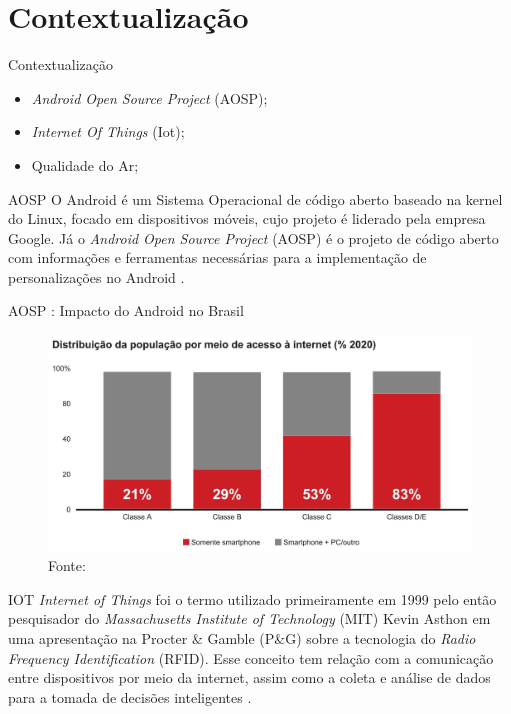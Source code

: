 \documentclass[12pt]{beamer}
\begin{document}
    \section{Contextualização}

    \begin{frame}{Contextualização}
        \begin{itemize}
            \item \textit{Android Open Source Project} (AOSP);
            \item \textit{Internet Of Things} (Iot);
            \item Qualidade do Ar;
        \end{itemize}
    \end{frame}

    \begin{frame}{AOSP}
        O Android é um Sistema Operacional de código aberto baseado na kernel do Linux, focado em dispositivos móveis, cujo projeto é liderado pela empresa Google. Já o \textit{Android Open Source Project} (AOSP) é o projeto  de código aberto com informações e ferramentas necessárias para a implementação de personalizações no Android \cite{aosp-documentation}. 
    \end{frame}

    \begin{frame}{AOSP : Impacto do Android no Brasil}
        \begin{figure}
            \centering
            \includegraphics[width=0.92\linewidth]{android-2.png}
            \caption{Fonte: \cite{impactoAndroidBrazil}}
            \label{fig:fig4}
        \end{figure}
    \end{frame}

    \begin{frame}{IOT}
        \textit{Internet of Things} foi o termo utilizado primeiramente em 1999 pelo então pesquisador do \textit{Massachusetts Institute of Technology} (MIT) Kevin Asthon em uma apresentação na Procter \& Gamble (P\&G) sobre a tecnologia do \textit{Radio Frequency Identification} (RFID). Esse conceito tem relação com a comunicação entre dispositivos por meio da internet, assim como a coleta e análise de dados para a tomada de decisões inteligentes \cite{refTermoIOT}.
    \end{frame}
\end{document}
